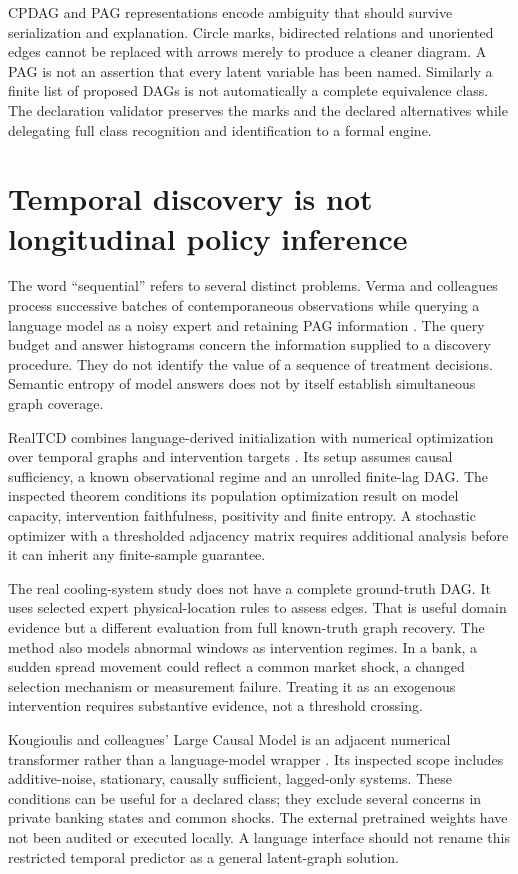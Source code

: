 CPDAG and PAG representations encode ambiguity that should survive
serialization and explanation. Circle marks, bidirected relations and
unoriented edges cannot be replaced with arrows merely to produce a cleaner
diagram. A PAG is not an assertion that every latent variable has been named.
Similarly a finite list of proposed DAGs is not automatically a complete
equivalence class. The declaration validator preserves the marks and the
declared alternatives while delegating full class recognition and
identification to a formal engine.

\section{Temporal discovery is not longitudinal policy inference}

The word ``sequential'' refers to several distinct problems. Verma and
colleagues process successive batches of contemporaneous observations while
querying a language model as a noisy expert and retaining PAG information
\cite{v12_la_2506_16234}. The query budget and answer histograms concern
the information supplied to a discovery procedure. They do not identify the
value of a sequence of treatment decisions. Semantic entropy of model answers
does not by itself establish simultaneous graph coverage.

RealTCD combines language-derived initialization with numerical optimization
over temporal graphs and intervention targets
\cite{v12_la_2404_14786}. Its setup assumes causal sufficiency, a known
observational regime and an unrolled finite-lag DAG. The inspected theorem
conditions its population optimization result on model capacity, intervention
faithfulness, positivity and finite entropy. A stochastic optimizer with a
thresholded adjacency matrix requires additional analysis before it can inherit
any finite-sample guarantee.

The real cooling-system study does not have a complete ground-truth DAG. It
uses selected expert physical-location rules to assess edges. That is useful
domain evidence but a different evaluation from full known-truth graph
recovery. The method also models abnormal windows as intervention regimes.
In a bank, a sudden spread movement could reflect a common market shock, a
changed selection mechanism or measurement failure. Treating it as an
exogenous intervention requires substantive evidence, not a threshold crossing.

Kougioulis and colleagues' Large Causal Model is an adjacent numerical
transformer rather than a language-model wrapper
\cite{v12_la_2602_18662}. Its inspected scope includes additive-noise,
stationary, causally sufficient, lagged-only systems. These conditions can be
useful for a declared class; they exclude several concerns in private banking
states and common shocks. The external pretrained weights have not been
audited or executed locally. A language interface should not rename this
restricted temporal predictor as a general latent-graph solution.

